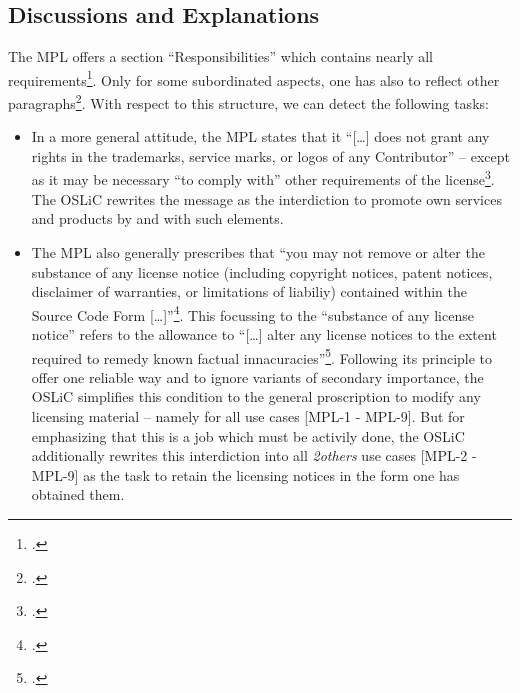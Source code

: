 \subsection{Discussions and Explanations}

The MPL offers a section \enquote{Responsibilities} which contains nearly all
requirements\footcite[cf.][\nopage wp.\ §3]{Mpl20OsiLicense2013a}. Only for some
subordinated aspects, one has also to reflect other paragraphs\footcite[pars
pro to cf.][\nopage wp.\ §3 - concerning the trademarks]{Mpl20OsiLicense2013a}.
With respect to this structure, we can detect the following tasks:

\begin{itemize}

  \item In a more general attitude, the MPL states that it \enquote{[\ldots]
  does not grant any rights in the trademarks, service marks, or logos of any
  Contributor} -- except as it may be necessary \enquote{to comply with} other
  requirements of the license\footcite[cf.][\nopage wp.\
  §2.3]{Mpl20OsiLicense2013a}. The OSLiC rewrites the message as the
  interdiction to promote own services and products by and with such elements.
  
  \item The MPL also generally prescribes that \enquote{you may not remove or
  alter the substance of any license notice (including copyright notices, patent
  notices, disclaimer of warranties, or limitations of liabiliy) contained
  within the Source Code Form [\ldots]}\footcite[cf.][\nopage wp.\
  §3.4]{Mpl20OsiLicense2013a}. This focussing to the \enquote{substance of any
  license notice} refers to the allowance to \enquote{[\ldots] alter any license
  notices to the extent required to remedy known factual
  innacuracies}\footcite[cf.][\nopage wp.\ §3.4]{Mpl20OsiLicense2013a}.
  Following its principle to offer one reliable way and to ignore variants of
  secondary importance, the OSLiC simplifies this condition to the general
  proscription to modify any licensing material -- namely for all use cases
  [MPL-1 - MPL-9]. But for emphasizing that this is a job which must be activily
  done, the OSLiC additionally rewrites this interdiction into all
  \emph{2others} use cases [MPL-2 - MPL-9] as the task to retain the licensing
  notices in the form one has obtained them.
  

\end{itemize}
